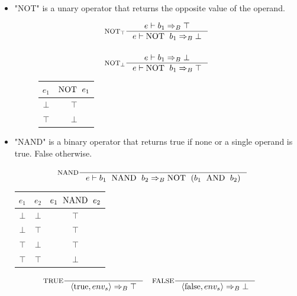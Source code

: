 \begin{itemize}
\item "NOT" is a unary operator that returns the opposite value of the operand.

\begin{figure}[H]
\centering
\begin{minipage}[c]{0.45\linewidth}
\centering
\begin{align*}
&\inference[$\text{NOT}_\top$]{e \vdash b_1 \Rightarrow_B \top}
                       {e \vdash \Tnot b_1 \Rightarrow_B \bot}
\\\\
&\inference[$\text{NOT}_\bot$]{e \vdash b_1 \Rightarrow_B \bot}
                       {e \vdash \Tnot b_1 \Rightarrow_B \top}
\end{align*}
\end{minipage}
\quad
\begin{minipage}[c]{0.45\linewidth}
\centering
\begin{tabular}{ | c | c | }
\hline
$e_1$ & $ \text{NOT \;} e_1$ \\\hline
$\bot$ & $\top$ \\\hline
$\top$ & $\bot$ \\\hline
\end{tabular}
\end{minipage}
\end{figure}

\item "NAND" is a binary operator that returns true if none or a single operand is true. False otherwise.

\begin{align*}
&\inference[NAND]{}
                   {e \vdash b_1 \Tnand b_2 \Rightarrow_B \Tnot( b_1 \Tand b_2 )}
\end{align*}

\begin{center}
\begin{tabular}{ | c | c | c | }
\hline
$e_1$ & $e_2$ & $e_1 \text{\; NAND \;} e_2$ \\\hline
$\bot$ & $\bot$ & $\top$ \\\hline
$\bot$ & $\top$ & $\top$ \\\hline
$\top$ & $\bot$ & $\top$ \\\hline
$\top$ & $\top$ & $\bot$ \\\hline
\end{tabular}
\end{center}
\end{itemize}

\begin{align*}
&\inference[TRUE]{}
                   {\Braket{\Ttrue,env_s} \Rightarrow_B \top}
&\inference[FALSE]{}
                   {\Braket{\Tfalse,env_s} \Rightarrow_B \bot}
\end{align*}

